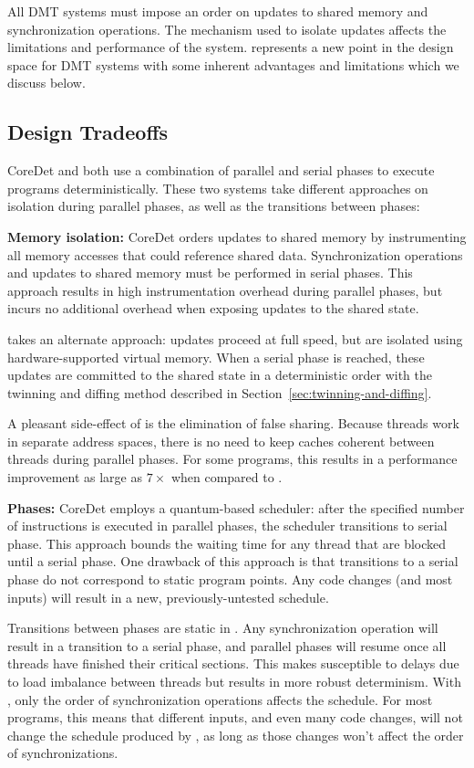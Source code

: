 \label{sec:discussion} All DMT systems must impose an order on updates to shared memory and synchronization operations.  The
mechanism used to isolate updates affects the limitations and performance of the
system.  \dthreads{} represents a new point in the design space for DMT systems with some inherent advantages and limitations which we discuss below.

\subsection{Design Tradeoffs} 

CoreDet and \dthreads{} both use a combination of
parallel and serial phases to execute programs deterministically.  These two systems take different approaches on isolation during parallel phases, as
well as the transitions between phases:

\textbf{Memory isolation:} 
CoreDet orders updates to shared memory by
instrumenting all memory accesses that could reference shared data. Synchronization operations and updates to shared memory must be performed in serial phases. This approach results in high instrumentation overhead during parallel phases, but incurs no additional overhead when exposing updates to the
shared state.

\dthreads{} takes an alternate approach: updates proceed at full speed, but are isolated using hardware-supported virtual memory.  When a serial phase is reached, these updates are committed to the shared state in a deterministic order with
the twinning and diffing method described in Section~\ref{sec:twinning-and-diffing}.

A pleasant side-effect of \dthreads{} is the elimination of false sharing. Because threads work in separate address spaces, there is no need to keep caches coherent between threads during parallel phases.  For some programs, this results in a performance improvement as large as $7\times$ when compared to
\pthreads{}.

\textbf{Phases:} 
CoreDet employs a quantum-based scheduler: after the specified number of instructions is executed in parallel phases, the scheduler transitions to serial phase. This approach bounds the waiting time for any thread that are blocked until a serial phase.  One drawback of this approach is that transitions to a serial phase do not correspond to static program points.  Any code changes (and most inputs) will result in a new, previously-untested schedule.

Transitions between phases are static in \dthreads{}.  Any synchronization operation will result in a transition to a serial phase, and parallel phases
will resume once all threads have finished their critical sections.  This makes \dthreads{} susceptible to delays due to load imbalance between threads but results in more robust determinism.  With \dthreads{}, only the order of synchronization operations affects the schedule. For most programs, this means that different inputs, and even many code changes, will not change the schedule produced by \dthreads{}, as long as those changes won't affect the order of synchronizations.

